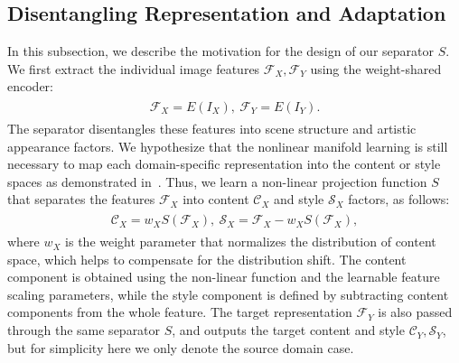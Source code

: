 \documentclass[final]{cvpr}
\begin{document}
\subsection{Disentangling Representation and Adaptation}
\label{sec:Network}
In this subsection, we describe the motivation for the design of our separator $S$.
We first extract the individual image features $\mathcal{F}_X,\mathcal{F}_Y$ using the weight-shared encoder:
\begin{gather}
\begin{split}
\mathcal{F}_X = E(I_X),~\mathcal{F}_Y = E(I_Y).
\end{split}
\end{gather}
The separator disentangles these features into scene structure and artistic appearance factors.
We hypothesize that the nonlinear manifold learning is still necessary to map each domain-specific representation into the content or style spaces as demonstrated in~\cite{elgammal2004separating}.
Thus, we learn a non-linear projection function $S$ that separates the features $\mathcal{F}_X$ into content $\mathcal{C}_X$ and style $\mathcal{S}_X$ factors, as follows:
\begin{gather}
\begin{split}
\mathcal{C}_X = w_XS(\mathcal{F}_X),~
\mathcal{S}_X = \mathcal{F}_X-w_XS(\mathcal{F}_X),
\end{split}
\end{gather}
where $w_X$ is the weight parameter that normalizes the distribution of content space, which helps to compensate for the distribution shift.
The content component is obtained using the non-linear function and the learnable feature scaling parameters, while the style component is defined by subtracting content components from the whole feature.
The target representation $\mathcal{F}_Y$ is also passed through the same separator $S$, and outputs the target content and style $\mathcal{C}_Y, \mathcal{S}_Y$, but for simplicity here we only denote the source domain case.
\end{document}
